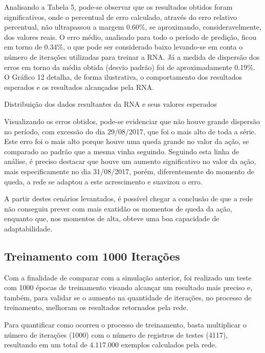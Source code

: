 Analisando a Tabela 5, pode-se observar que os resultados obtidos foram significativos, onde o percentual de erro calculado, através do erro relativo percentual, não ultrapassou a margem 0.60\%, se aproximando, consideravelmente, dos valores reais. O erro médio, analisado para todo o período de predição, ficou em torno de 0.34\%, o que pode ser considerado baixo levando-se em conta o número de iterações utilizadas para treinar a RNA. Já a medida de dispersão dos erros em torno da média obtida (desvio padrão) foi de aproximadamente 0.19\%. O Gráfico 12 detalha, de forma ilustrativa, o comportamento dos resultados esperados e os resultados alcançados pela RNA.
\begin{grafico}[h]
	\centering
	\caption{Distribuição dos dados resultantes da RNA e seus valores esperados}
	\label{lingua}
\end{grafico}

Visualizando os erros obtidos, pode-se evidenciar que não houve grande dispersão no período, com excessão do dia 29/08/2017, que foi o mais alto de toda a série. Este erro foi o mais alto porque houve uma queda grande no valor da ação, se comparado ao padrão que a mesma vinha seguindo. Seguindo esta linha de análise, é preciso destacar que houve um aumento significativo no valor da ação, mais especificamente no dia 31/08/2017, porém, diferentemente do momento de queda, a rede se adaptou a este acrescimento e suavizou o erro. 

A partir destes cenários levantados, é possível chegar a conclusão de que a rede não conseguiu prever com mais exatidão os momentos de queda da ação, enquanto que, nos momentos de alta, obteve uma boa capacidade de adaptabilidade.

\subsection{Treinamento com 1000 Iterações}	
Com a finalidade de comparar com a simulação anterior, foi realizado um teste com 1000 épocas de treinamento visando alcançar um resultado mais preciso e, também, para validar se o aumento na quantidade de iterações, no processo de treinamento, melhoram os resultados retornados pela rede.

Para quantificar como ocorreu o processo de treinamento, basta multiplicar o número de iterações (1000) com o número de registros de testes (4117), resultando em um total de 4.117.000 exemplos calculados pela rede.

